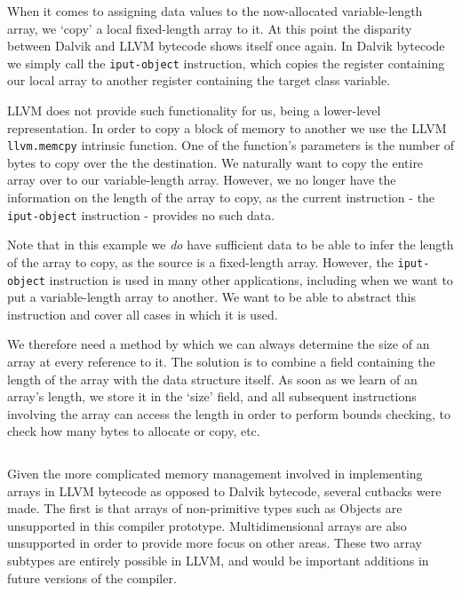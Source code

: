 \begin{lstlisting}[frame=single, caption={LLVM pointer array}, label=lst:llvm_ptr]
%a = i32*
\end{lstlisting}

When it comes to assigning data values to the now-allocated variable-length array, we `copy' a local fixed-length array to it. At this point the disparity between Dalvik and LLVM bytecode shows itself once again. In Dalvik bytecode we simply call the \verb|iput-object| instruction, which copies the register containing our local array to another register containing the target class variable.

LLVM does not provide such functionality for us, being a lower-level representation. In order to copy a block of memory to another we use the LLVM \verb|llvm.memcpy| intrinsic function. One of the function's parameters is the number of bytes to copy over the the destination. We naturally want to copy the entire array over to our variable-length array. However, we no longer have the information on the length of the array to copy, as the current instruction - the \verb|iput-object| instruction - provides no such data.

Note that in this example we \textit{do} have sufficient data to be able to infer the length of the array to copy, as the source is a fixed-length array. However, the \verb|iput-object| instruction is used in many other applications, including when we want to put a variable-length array to another. We want to be able to abstract this instruction and cover all cases in which it is used.


We therefore need a method by which we can always determine the size of an array at every reference to it. The solution is to combine a field containing the length of the array with the data structure itself. As soon as we learn of an array's length, we store it in the `size' field, and all subsequent instructions involving the array can access the length in order to perform bounds checking, to check how many bytes to allocate or copy, etc.

\lstset{
	language=Assembly,
	basicstyle=\small,
	stringstyle=\ttfamily
}
\begin{lstlisting}[frame=single]
%struct_array = { i32, i32* }
\end{lstlisting}

Given the more complicated memory management involved in implementing arrays in LLVM bytecode as opposed to Dalvik bytecode, several cutbacks were made. The first is that arrays of non-primitive types such as Objects are unsupported in this compiler prototype. Multidimensional arrays are also unsupported in order to provide more focus on other areas. These two array subtypes are entirely possible in LLVM, and would be important additions in future versions of the compiler.
